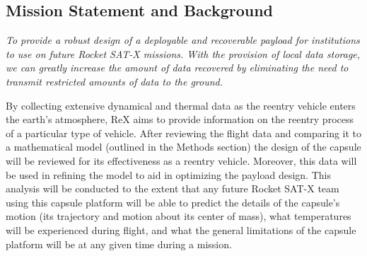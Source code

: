 \documentclass{article}
\begin{document}
\begin{doublespace}
	\subsection{Mission Statement and Background}
	\begin{center}
		\emph{To provide a robust design of a deployable and recoverable payload for institutions to use on future Rocket SAT-X missions. With the provision of local data storage, we can greatly increase the amount of data recovered by eliminating the need to transmit restricted amounts of data to the ground.}\\
	\end{center}
		\indent\indent  By collecting extensive dynamical and thermal data as the reentry vehicle enters the earth's atmosphere, ReX aims to provide information on the reentry process of a particular type of vehicle. After reviewing the flight data and comparing it to a mathematical model (outlined in the Methods section) the design of the capsule will be reviewed for its effectiveness as a reentry vehicle. Moreover, this data will be used in refining the model to aid in optimizing the payload design. This analysis will be conducted to the extent that any future Rocket SAT-X team using this capsule platform will be able to predict the details of the capsule's motion (its trajectory and motion about its center of mass), what temperatures will be experienced during flight, and what the general limitations of the capsule platform will be at any given time during a mission.

\end{doublespace}
\end{document}
